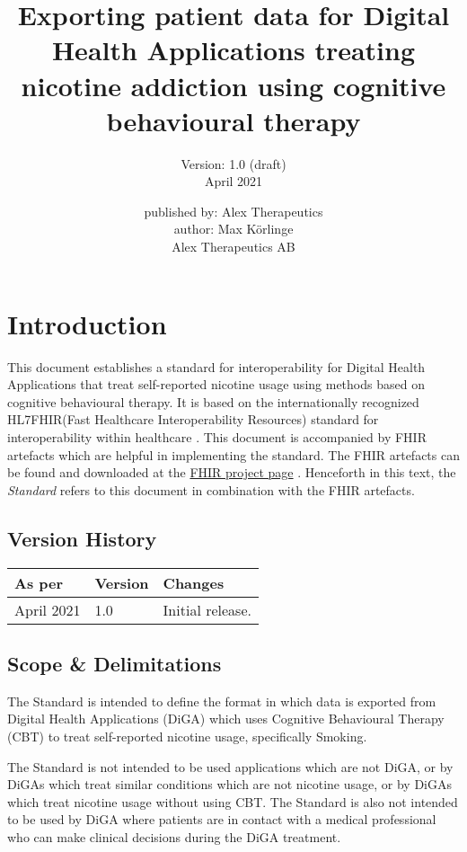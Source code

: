 \documentclass[12px]{report}
\title{Exporting patient data for Digital Health Applications treating nicotine addiction using cognitive behavioural therapy \vspace{2cm}}
\author{Version: 1.0 (draft) \\ April 2021 \\ \vspace{6cm}}
\date{published by: Alex Therapeutics \\ author: Max Körlinge \\ \textcopyright  Alex Therapeutics AB}
\newcommand{\fhir}{FHIR\textsuperscript{\textregistered}}
\newcommand{\hl}{HL7\textsuperscript{\textregistered}}
\begin{document}
\maketitle
\tableofcontents

\chapter{Introduction}
\label{ch:intro}

This document establishes a standard for interoperability for Digital Health Applications that treat self-reported nicotine usage using methods based on cognitive behavioural therapy. It is based on the internationally recognized \hl \fhir (Fast Healthcare Interoperability Resources) standard for interoperability 
within healthcare \cite{FHIR}. This document is accompanied by FHIR artefacts which are helpful in implementing the standard. The FHIR artefacts can be found and downloaded at the \href{https://simplifier.net/treat-nicotine-usage-diga}{FHIR project page} \cite{project}.
Henceforth in this text, the \textit{Standard} refers to this document in combination with the FHIR artefacts.

\section{Version History}
\begin{table}[H]
    \begin{tabular}{@{}lll@{}}
    \textbf{As per}                 & \textbf{Version}         & \textbf{Changes} \\ \midrule
    \multicolumn{1}{l|}{April 2021} & \multicolumn{1}{l|}{1.0} & Initial release. \\ \bottomrule
    \end{tabular}
    \label{tab:version}
    \end{table}

\section{Scope \& Delimitations}

The Standard is intended to define the format in which data is exported from Digital Health Applications (DiGA) which uses Cognitive Behavioural Therapy (CBT) to treat self-reported nicotine usage, specifically Smoking.

The Standard is not intended to be used applications which are not DiGA, or by DiGAs which treat similar conditions which are not nicotine usage, or by DiGAs which treat nicotine usage without using CBT. 
The Standard is also not intended to be used by DiGA where patients are in contact with a medical professional who can make clinical decisions during the DiGA treatment.
\end{document}
